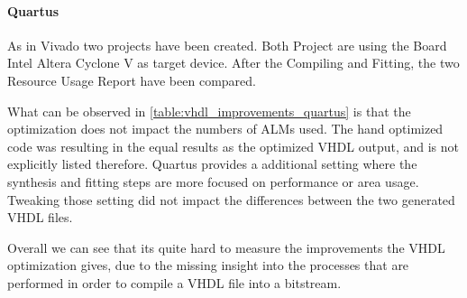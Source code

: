 \paragraph{Quartus}
As in Vivado two projects have been created. Both Project are using the Board Intel Altera Cyclone V as target device. After the Compiling and Fitting, the two Resource Usage Report have been compared.

What can be observed in \autoref{table:vhdl_improvements_quartus} is that the optimization does not impact the numbers of ALMs used. The hand optimized code was resulting in the equal results as the optimized VHDL output, and is not explicitly listed therefore. Quartus provides a additional setting where the synthesis and fitting steps are more focused on performance or area usage. Tweaking those setting did not impact the differences between the two generated VHDL files.

Overall we can see that its quite hard to measure the improvements the VHDL optimization gives, due to the missing insight into the processes that are performed in order to compile a VHDL file into a bitstream.
